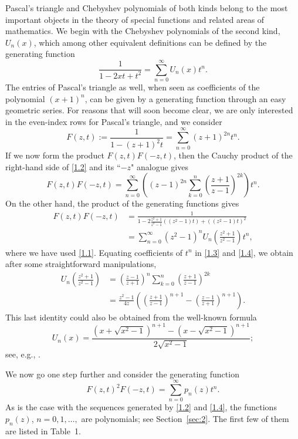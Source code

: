 \documentclass{amsart}
\theoremstyle{plain}
\numberwithin{equation}{section}
\begin{document}
Pascal's triangle and Chebyshev polynomials of both kinds belong to the most 
important objects in the theory of special functions and related areas of
mathematics. We begin with the Chebyshev polynomials of the second kind,
$U_n(x)$, which among other equivalent definitions can be defined by the
generating function
\begin{equation}\label{1.1}
\frac{1}{1-2xt+t^2} = \sum_{n=0}^\infty U_n(x)t^n.
\end{equation}
The entries of Pascal's triangle as well, when seen as coefficients of the 
polynomial
$(x+1)^n$, can be given by a generating function through an easy geometric
series. For reasons that will soon become clear, we are only interested in the
even-index rows for Pascal's triangle, and we consider
\begin{equation}\label{1.2}
F(z,t):=\frac{1}{1-(z+1)^2t} = \sum_{n=0}^\infty(z+1)^{2n}t^n.
\end{equation}
If we now form the product $F(z,t)F(-z,t)$, then the Cauchy product of the
right-hand side of \eqref{1.2} and its ``$-z$" analogue gives
\begin{equation}\label{1.3}
F(z,t)F(-z,t)=\sum_{n=0}^\infty\left((z-1)^{2n}
\sum_{k=0}^n\left(\frac{z+1}{z-1}\right)^{2k}\right)t^n.
\end{equation}
On the other hand, the product of the generating functions gives
\begin{align}
F(z,t)F(-z,t)
&=\frac{1}{1-2\tfrac{z^2+1}{z^2-1}\left((z^2-1)t\right)+\left((z^2-1)t\right)^2}\label{1.4} \\
&=\sum_{n=0}^\infty(z^2-1)^nU_n(\tfrac{z^2+1}{z^2-1})t^n,\nonumber
\end{align}
where we have used \eqref{1.1}. Equating coefficients of $t^n$ in \eqref{1.3}
and \eqref{1.4}, we obtain after some straightforward manipulations,
\begin{align*}
U_n(\tfrac{z^2+1}{z^2-1}) &=\left(\frac{z-1}{z+1}\right)^n
\sum_{k=0}^n\left(\frac{z+1}{z-1}\right)^{2k} \\
&= \frac{z^2-1}{4z}\left(\left(\frac{z+1}{z-1}\right)^{n+1}
-\left(\frac{z-1}{z+1}\right)^{n+1}\right).
\end{align*}
This last identity could also be obtained from the well-known formula
\begin{equation}\label{1.6}
U_n(x)=\frac{\left(x+\sqrt{x^2-1}\right)^{n+1}
-\left(x-\sqrt{x^2-1}\right)^{n+1}}{2\sqrt{x^2-1}};
\end{equation}
see, e.g., \cite[p.~10]{Ri}.

We now go one step further and consider the generating function
\begin{equation}\label{1.7}
F(z,t)^2F(-z,t)=\sum_{n=0}^\infty p_n(z)t^n.
\end{equation}
As is the case with the sequences generated by \eqref{1.2} and \eqref{1.4},
the functions $p_n(z)$, $n=0, 1, \ldots,$ are polynomials; see 
Section~\ref{sec:2}. The first few of them are listed in Table~1.
\end{document}
